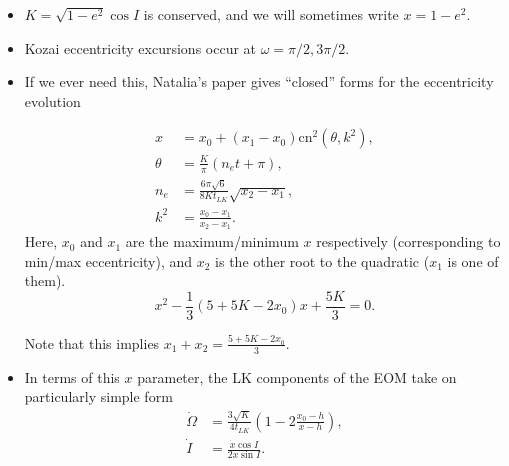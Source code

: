 \documentclass[11pt,
        usenames, %
        dvipsnames %
    ]{article}
\newcommand*{\p}[1]{\left(#1\right)}
\begin{document}
\begin{itemize}
    \item $K = \sqrt{1 - e^2}\cos I$ is conserved, and we will sometimes write
        $x = 1 - e^2$.

    \item Kozai eccentricity excursions occur at $\omega = \pi/2, 3\pi/2$.

    \item If we ever need this, Natalia's paper gives ``closed'' forms for the
        eccentricity evolution

        \begin{align}
            x &= x_0 + \p{x_1 - x_0}\mathrm{cn}^2(\theta, k^2),\\
            \theta &= \frac{K}{\pi}\p{n_e t + \pi},\\
            n_e &= \frac{6\pi \sqrt{6}}{8Kt_{LK}}\sqrt{x_2 - x_1},\\
            k^2 &= \frac{x_0 - x_1}{x_2 - x_1}.
        \end{align}
        Here, $x_0$ and $x_1$ are the maximum/minimum $x$ respectively
        (corresponding to min/max eccentricity), and $x_2$ is the other root to
        the quadratic ($x_1$ is one of them).
        \begin{equation}
            x^2 - \frac{1}{3}\p{5 + 5K - 2x_0}x + \frac{5K}{3} = 0.
        \end{equation}

        Note that this implies $x_1 + x_2 = \frac{5 + 5K - 2x_0}{3}$.

    \item In terms of this $x$ parameter, the LK components of the EOM
        take on particularly simple form
        \begin{align}
            \dot{\Omega} &= \frac{3\sqrt{K}}{4t_{LK}}\p{1 - 2\frac{x_0 - h}{x -
                h}},\\
            \dot{I} &= \frac{\dot{x} \cos I}{2x \sin I}.
        \end{align}
\end{itemize}
\end{document}
